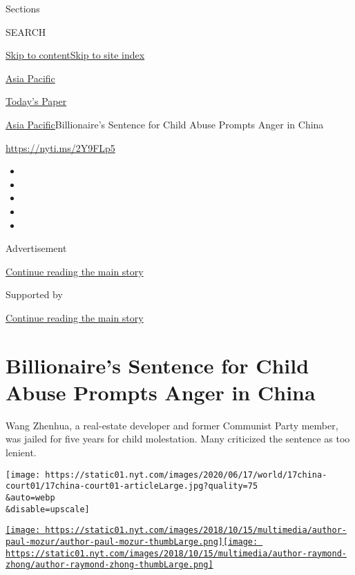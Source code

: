Sections

SEARCH

\protect\hyperlink{site-content}{Skip to
content}\protect\hyperlink{site-index}{Skip to site index}

\href{https://www.nytimes.com/section/world/asia}{Asia Pacific}

\href{https://myaccount.nytimes.com/auth/login?response_type=cookie\&client_id=vi}{}

\href{https://www.nytimes.com/section/todayspaper}{Today's Paper}

\href{/section/world/asia}{Asia Pacific}\textbar{}Billionaire's Sentence
for Child Abuse Prompts Anger in China

\url{https://nyti.ms/2Y9FLp5}

\begin{itemize}
\item
\item
\item
\item
\item
\end{itemize}

Advertisement

\protect\hyperlink{after-top}{Continue reading the main story}

Supported by

\protect\hyperlink{after-sponsor}{Continue reading the main story}

\hypertarget{billionaires-sentence-for-child-abuse-prompts-anger-in-china}{%
\section{Billionaire's Sentence for Child Abuse Prompts Anger in
China}\label{billionaires-sentence-for-child-abuse-prompts-anger-in-china}}

Wang Zhenhua, a real-estate developer and former Communist Party member,
was jailed for five years for child molestation. Many criticized the
sentence as too lenient.

\texttt{[image: https://static01.nyt.com/images/2020/06/17/world/17china-court01/17china-court01-articleLarge.jpg?quality=75\\\&auto=webp\\\&disable=upscale]}

\href{https://www.nytimes.com/by/paul-mozur}{\texttt{[image: https://static01.nyt.com/images/2018/10/15/multimedia/author-paul-mozur/author-paul-mozur-thumbLarge.png]}}\href{https://www.nytimes.com/by/raymond-zhong}{\texttt{[image: https://static01.nyt.com/images/2018/10/15/multimedia/author-raymond-zhong/author-raymond-zhong-thumbLarge.png]}}

